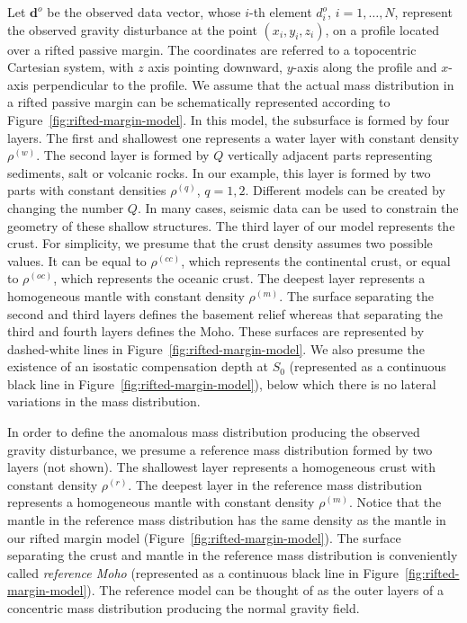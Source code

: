 \documentclass[manuscript]{geophysics}
\begin{document}
Let $\mathbf{d}^{o}$ be the observed data vector, whose $i$-th element $d^{o}_{i}$, 
$i = 1, \dots, N$, represent the observed gravity disturbance at the point 
$(x_{i}, y_{i}, z_{i})$, on a profile located over a rifted passive margin. The
coordinates are referred to a topocentric Cartesian system, with $z$ axis pointing
downward, $y$-axis along the profile and $x$-axis perpendicular to the profile. 
We assume that the actual mass distribution in a rifted passive margin can be 
schematically represented according to Figure~\ref{fig:rifted-margin-model}. 
In this model, the subsurface is formed by four layers. 
The first and shallowest one represents a water layer with constant density
$\rho^{(w)}$. 
The second layer is formed by $Q$ vertically adjacent parts representing sediments,
salt or volcanic rocks.
In our example, this layer is formed by two parts with constant densities
$\rho^{(q)}$, $q = 1, 2$. Different models can be created by changing the number $Q$.
In many cases, seismic data can be used to constrain the geometry of these 
shallow structures.
The third layer of our model represents the crust. For simplicity, we presume that the
crust density assumes two possible values. It can be equal to $\rho^{(cc)}$, which
represents the continental crust, or equal to $\rho^{(oc)}$, which represents the
oceanic crust.
The deepest layer represents a homogeneous mantle with constant density $\rho^{(m)}$. 
The surface separating the second and third layers defines the basement relief whereas
that separating the third and fourth layers defines the Moho. These surfaces are
represented by dashed-white lines in Figure~\ref{fig:rifted-margin-model}.
We also presume the existence of an isostatic compensation depth at $S_{0}$ 
(represented as a continuous black line in Figure~\ref{fig:rifted-margin-model}),
below which there is no lateral variations in the mass distribution.

In order to define the anomalous mass distribution producing the observed gravity
disturbance, we presume a reference mass distribution formed by two 
layers (not shown). The shallowest layer represents a homogeneous crust with constant
density $\rho^{(r)}$.
The deepest layer in the reference mass distribution represents a homogeneous mantle
with constant density $\rho^{(m)}$. Notice that the mantle in the reference mass 
distribution has the same density as the mantle in our rifted margin model
(Figure~\ref{fig:rifted-margin-model}).
The surface separating the crust and mantle in the reference mass distribution 
is conveniently called \textit{reference Moho} (represented as a continuous black line
in Figure~\ref{fig:rifted-margin-model}).
The reference model can be thought of as the outer layers of a concentric
mass distribution producing the normal gravity field.
\end{document}
